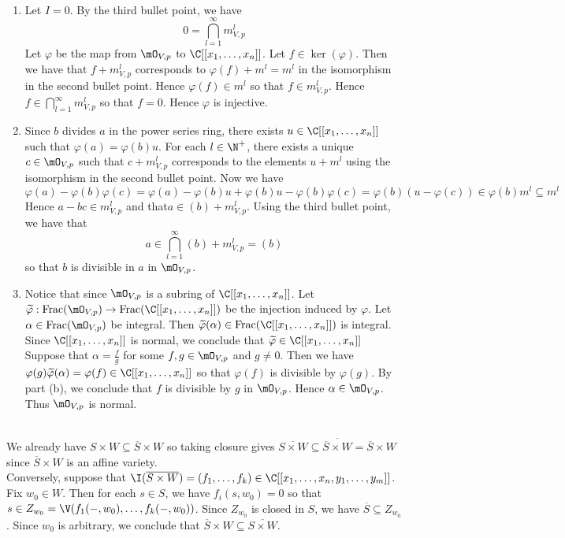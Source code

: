 \documentclass[a4paper]{article}
\begin{document}
\begin{ex}{}{}\\
\begin{enumerate}[label=(\alph*)]
\item Let $I=0$. By the third bullet point, we have $$0=\bigcap_{l=1}^\infty m_{V,p}^l$$ Let $\varphi$ be the map from $\mO_{V,p}$ to $\C[[x_1,\dots,x_n]]$. Let $f\in\ker(\varphi)$. Then we have that $f+m_{V,p}^l$ corresponds to $\varphi(f)+m^l=m^l$ in the isomorphism in the second bullet point. Hence $\varphi(f)\in m^l$ so that $f\in m_{V,p}^l$. Hence $f\in\bigcap_{l=1}^\infty m_{V,p}^l$ so that $f=0$. Hence $\varphi$ is injective. 
\item Since $b$ divides $a$ in the power series ring, there exists $u\in\C[[x_1,\dots,x_n]]$ such that $\varphi(a)=\varphi(b)u$. For each $l\in\N^+$, there exists a unique $c\in\mO_{V,p}$ such that $c+m_{V,p}^l$ corresponds to the elements $u+m^l$ using the isomorphism in the second bullet point. Now we have $$\varphi(a)-\varphi(b)\varphi(c)=\varphi(a)-\varphi(b)u+\varphi(b)u-\varphi(b)\varphi(c)=\varphi(b)(u-\varphi(c))\in\varphi(b)m^l\subseteq m^l$$ Hence $a-bc\in m_{V,p}^l$ and that$a\in(b)+m_{V,p}^l$. Using the third bullet point, we have that $$a\in\bigcap_{l=1}^\infty(b)+m_{V,p}^l=(b)$$ so that $b$ is divisible in $a$ in $\mO_{V,p}$. 
\item Notice that since $\mO_{V,p}$ is a subring of $\C[[x_1,\dots,x_n]]$. Let $\widetilde{\varphi}:\text{Frac}(\mO_{V,p})\to\text{Frac}(\C[[x_1,\dots,x_n]])$ be the injection induced by $\varphi$. Let $\alpha\in\text{Frac}(\mO_{V,p})$ be integral. Then $\widetilde{\varphi}(\alpha)\in\text{Frac}(\C[[x_1,\dots,x_n]])$ is integral. Since $\C[[x_1,\dots,x_n]]$ is normal, we conclude that $\widetilde{\varphi}\in\C[[x_1,\dots,x_n]]$ Suppose that $\alpha=\frac{f}{g}$ for some $f,g\in\mO_{V,p}$ and $g\neq 0$. Then we have $\varphi(g)\widetilde{\varphi}(\alpha)=\varphi(f)\in\C[[x_1,\dots,x_n]]$ so that $\varphi(f)$ is divisible by $\varphi(g)$. By part (b), we conclude that $f$ is divisible by $g$ in $\mO_{V,p}$. Hence $\alpha\in\mO_{V,p}$. Thus $\mO_{V,p}$ is normal. 
\end{enumerate}
\end{ex}

\begin{ex}{}{}\\
We already have $S\times W\subseteq\overline{S}\times W$ so taking closure gives $\overline{S\times W}\subseteq\overline{\overline{S}\times W}=\overline{S}\times W$ since $\overline{S}\times W$ is an affine variety. \\

Conversely, suppose that $\I(\overline{S\times W})=(f_1,\dots,f_k)\in\C[[x_1,\dots,x_n,y_1,\dots,y_m]]$. Fix $w_0\in W$. Then for each $s\in S$, we have $f_i(s,w_0)=0$ so that $s\in Z_{w_0}=\V(f_1(-,w_0),\dots,f_k(-,w_0))$. Since $Z_{w_0}$ is closed in $S$, we have $\overline{S}\subseteq Z_{w_0}$. Since $w_0$ is arbitrary, we conclude that $\overline{S}\times W\subseteq\overline{S\times W}$. 
\end{ex}
\end{document}
